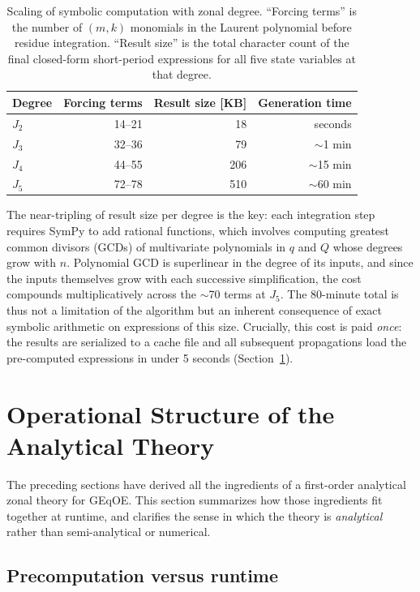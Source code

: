 \documentclass[11pt]{article}
\begin{document}
\begin{table}[ht]
\centering
\caption{Scaling of symbolic computation with zonal degree.  ``Forcing
terms'' is the number of $(m, k)$ monomials in the Laurent polynomial
before residue integration.  ``Result size'' is the total character count
of the final closed-form short-period expressions for all five state
variables at that degree.}
\label{tab:symbolic_complexity}
\small
\begin{tabular}{@{}lrrr@{}}
\toprule
Degree & Forcing terms & Result size [KB] & Generation time \\
\midrule
$J_2$ & 14--21 & 18 & seconds \\
$J_3$ & 32--36 & 79 & $\sim$1 min \\
$J_4$ & 44--55 & 206 & $\sim$15 min \\
$J_5$ & 72--78 & 510 & $\sim$60 min \\
\bottomrule
\end{tabular}
\end{table}

The near-tripling of result size per degree is the key: each integration
step requires SymPy to add rational functions, which involves computing
greatest common divisors (GCDs) of multivariate polynomials in $q$ and $Q$
whose degrees grow with $n$.  Polynomial GCD is superlinear in the degree
of its inputs, and since the inputs themselves grow with each successive
simplification, the cost compounds multiplicatively across the
$\sim$70 terms at $J_5$.  The 80-minute total is thus not a
limitation of the algorithm but an inherent consequence of exact symbolic
arithmetic on expressions of this size.  Crucially, this cost is paid
\emph{once}: the results are serialized to a cache file and all subsequent
propagations load the pre-computed expressions in under 5 seconds
(Section~\ref{sec:operational}).

\section{Operational Structure of the Analytical Theory}
\label{sec:operational}

The preceding sections have derived all the ingredients of a first-order
analytical zonal theory for GEqOE. This section summarizes how those
ingredients fit together at runtime, and clarifies the sense in which the
theory is \emph{analytical} rather than semi-analytical or numerical.

\subsection{Precomputation versus runtime}
\end{document}
